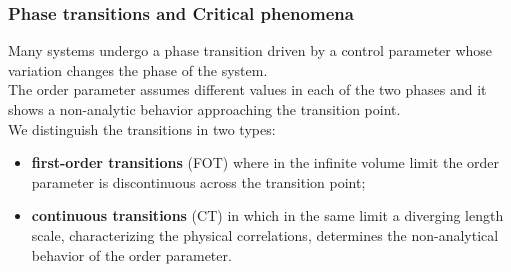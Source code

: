 \begin{frame}
\frametitle{Phase transitions and Critical phenomena}
Many systems undergo a phase transition driven by a control parameter whose variation changes the phase of the system.\\
$ $\\
The order parameter assumes different values in each of the two phases and it shows a non-analytic behavior approaching the transition point.\\
$ $\\
We distinguish the transitions in two types:
\begin{itemize}
\item \textbf{\alert{first-order transitions}} (FOT) where in the infinite volume limit the order parameter is discontinuous across the transition point;
\item \textbf{\alert{continuous transitions}} (CT) in which in the same limit a diverging length scale, characterizing the physical correlations, determines the non-analytical behavior of the order parameter.
\end{itemize}
\end{frame}



